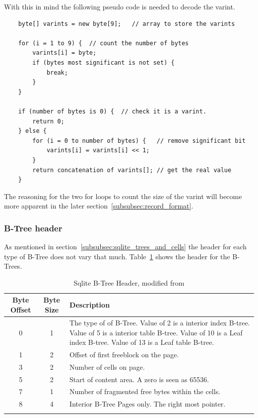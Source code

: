 With this in mind the following pseudo code is needed to decode the varint.

\begin{lstlisting}
	byte[] varints = new byte[9];	// array to store the varints

	for (i = 1 to 9) {	// count the number of bytes
		varints[i] = byte;
		if (bytes most significant is not set) {
			break;
		}
	}
	
	if (number of bytes is 0) {  // check it is a varint.
		return 0;
	} else {
		for (i = 0 to number of bytes) {   // remove significant bit
			varints[i] = varints[i] << 1;
		}
		return concatenation of varints[]; // get the real value
	}
\end{lstlisting}

The reasoning for the two for loops to count the size of the varint will become more apparent in the later section~\ref{subsubsec:record_format}.

\subsubsection{B-Tree header}
\label{subsubsec:btree_header}

As mentioned in section~\ref{subsubsec:sqlite_trees_and_cells} the header for each type of B-Tree does not vary that much. Table~\ref{tbl:btree_header} shows the header for the B-Trees.

\begin{longtable}[h]{| c | c | p{10cm} |}
		\hline
			\textbf{Byte Offset} & \textbf{Byte Size} & \textbf{Description} \\ 
		\hline
		\endhead
			0 & 1 & The type of of B-Tree. \newline
			Value of 2 is a interior index B-tree. \newline
			Value of 5 is a interior table B-tree. \newline
			Value of 10 is a Leaf index B-tree. \newline
			Value of 13 is a Leaf table B-tree. \\
		\hline
			1 & 2 & Offset of first freeblock on the page. \\
		\hline
			3 & 2 & Number of cells on page. \\
		\hline
			5 & 2 & Start of content area. A zero is seen as 65536. \\
		\hline
			7 & 1 & Number of fragmented free bytes within the cells. \\
		\hline
			8 & 4 & Interior B-Tree Pages only. The right most pointer. \\ 
		\hline
	\caption{Sqlite B-Tree Header, modified from \cite{sqlite}}
	\label{tbl:btree_header}
\end{longtable}


